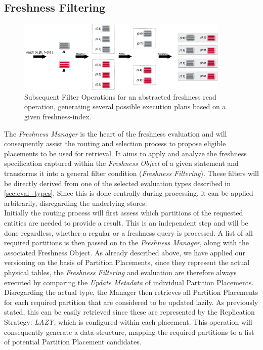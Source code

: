 
\subsection{Freshness Filtering}
\label{sec:fresh_filter} 

\begin{figure}[t] 
    \centering 
    \includegraphics[width=0.9\textwidth]{Figures/filter.png}
    \caption{Subsequent Filter Operations for an abstracted freshness read operation, generating several possible execution plans based on a given freshness-index.}
    \label{fig:filter}
\end{figure}

The \emph{Freshness Manager} is the heart of the freshness evaluation and will consequently assist the routing and selection process to propose eligible placements
to be used for retrieval. 
It aims to apply and analyze the freshness specification captured within the \emph{Freshness Object} of a given statement and transforms it 
into a general filter condition (\emph{Freshness Filtering}). These filters will be directly derived from one of the selected evaluation types described in \ref{sec:eval_types}.
Since this is done centrally during processing, it can be applied arbitrarily, disregarding the underlying stores.\\
Initially the routing process will first assess which partitions of the requested entities are needed to provide a result.
This is an independent step and will be done regardless, whether a regular or a freshness query is processed. 
A list of all required partitions is then passed on to the \emph{Freshness Manager}, along with the associated Freshness Object. 
As already described above, we have applied our versioning on the basis of Partition Placements, since they represent the actual physical tables,
the \emph{Freshness Filtering} and evaluation are therefore always executed by comparing the \emph{Update Metadata} of individual Partition Placements. 
Disregarding the actual type, the Manager then retrieves all Partition Placements for each required partition that are considered to be updated lazily.
As previously stated, this can be easily retrieved since these are represented by the Replication Strategy: \emph{LAZY}, which is configured within each placement. 
This operation will consequently generate a data-structure, mapping the required partitions to a list of potential Partition Placement candidates.

